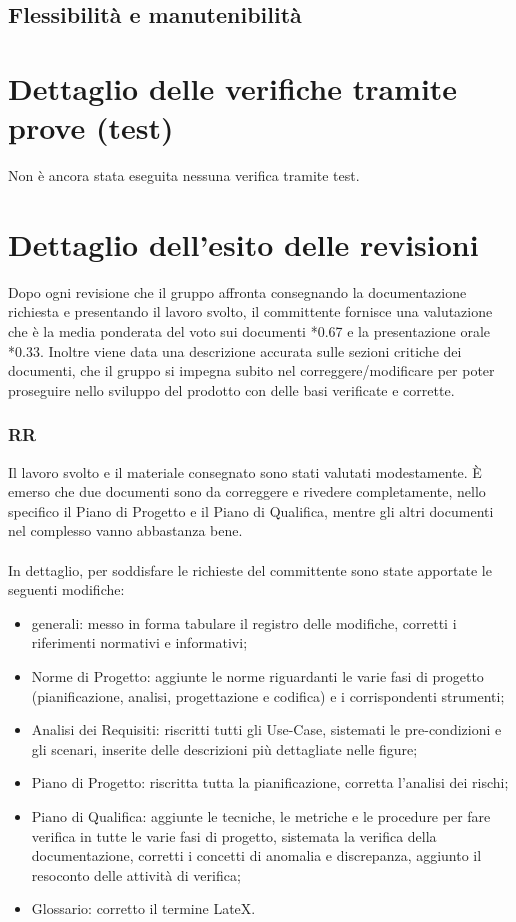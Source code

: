 \subsection*{Flessibilit\`a e manutenibilit\`a}



\section{Dettaglio delle verifiche tramite prove (test)}
Non \`e ancora stata eseguita nessuna verifica tramite test.

\section{Dettaglio dell'esito delle revisioni}
Dopo ogni revisione che il gruppo affronta consegnando la documentazione
richiesta e presentando il lavoro svolto, il committente fornisce una
valutazione che \`e la media ponderata del voto sui documenti *0.67 e la
presentazione orale *0.33. Inoltre viene data una descrizione accurata
sulle sezioni critiche dei documenti, che il gruppo si impegna subito
nel correggere/modificare per poter proseguire nello sviluppo del prodotto con delle
basi verificate e corrette.

\subsubsection{RR}
Il lavoro svolto e il materiale consegnato sono stati valutati modestamente. \`E
emerso che due documenti sono da correggere e rivedere completamente, nello
specifico il Piano di Progetto e il Piano di Qualifica, mentre gli altri documenti nel complesso
vanno abbastanza bene. \\ \\
In dettaglio, per soddisfare le richieste del committente sono state apportate
le seguenti modifiche:
\begin{itemize}
  \item generali: messo in forma tabulare il registro delle modifiche, corretti
  i riferimenti normativi e informativi;
  \item Norme di Progetto: aggiunte le norme riguardanti le varie fasi di
  progetto (pianificazione, analisi, progettazione e codifica) e i corrispondenti strumenti;
  \item Analisi dei Requisiti: riscritti tutti gli Use-Case, sistemati le
  pre-condizioni e gli scenari, inserite delle descrizioni pi\`u dettagliate
  nelle figure;
  \item Piano di Progetto: riscritta tutta la pianificazione, corretta l'analisi
  dei rischi;
  \item Piano di Qualifica: aggiunte le tecniche, le metriche e le procedure per
  fare verifica in tutte le varie fasi di progetto, sistemata la verifica della
  documentazione, corretti i concetti di anomalia e discrepanza, aggiunto
  il resoconto delle attivit\`a di verifica;
  \item Glossario: corretto il termine LateX.
\end{itemize}


